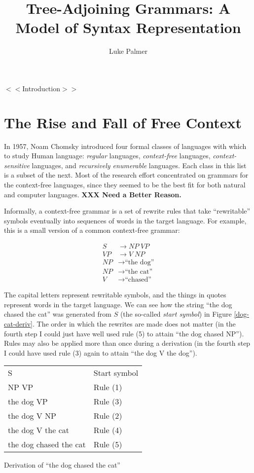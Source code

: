 \documentclass[12pt]{article}
\title{Tree-Adjoining Grammars: A Model of Syntax Representation}
\author{Luke Palmer}
\newcommand{\defn}[1]{\textit{#1}}
\newcommand{\XXX}[1]{\textbf{XXX #1}}
\begin{document}
\maketitle
\doublespace

$<<$Introduction$>>$

\section{The Rise and Fall of Free Context}

In 1957, Noam Chomsky introduced four formal classes of languages with
which to study Human language:  \defn{regular} languages,
\defn{context-free} languages, \defn{context-sensitive} languages,
and \defn{recursively enumerable} languages.  Each class in this list
is a subset of the next.  Most of the research effort concentrated on
grammars for the context-free languages, since they seemed to be the
best fit for both natural and computer languages. \XXX{Need a
Better Reason.}

Informally, a context-free grammar is a set of rewrite rules that take
``rewritable'' symbols eventually into sequences of words in the target
language.  For example, this is a small version of a common context-free
grammar:

\begin{align}
S  &\rightarrow \mathit{NP} \; \mathit{VP}      \tag{1} \\
\mathit{VP} &\rightarrow V \; \mathit{NP}       \tag{2} \\
\mathit{NP} &\rightarrow \text{``the dog''}     \tag{3} \\
\mathit{NP} &\rightarrow \text{``the cat''}     \tag{4} \\
V  &\rightarrow \text{``chased''}               \tag{5}
\end{align}

The capital letters represent rewritable symbols, and the things in
quotes represent words in the target language.  We can see how the
string ``the dog chased the cat'' was generated from $S$ (the so-called
\defn{start symbol}) in Figure \ref{dog-cat-deriv}.  The order in
which the rewrites are made does not matter (in the fourth step I could
just have well used rule (5) to attain ``the dog chased NP'').  Rules may
also be applied more than once during a derivation (in the fourth step I
could have used rule (3) again to attain ``the dog V the dog'').

\begin{Figure}
\begin{tabularx}{\linewidth}{X|X}
S                      & Start symbol \\
NP VP                  & Rule (1) \\
the dog VP             & Rule (3) \\
the dog V NP           & Rule (2) \\
the dog V the cat      & Rule (4) \\
the dog chased the cat & Rule (5) \\
\end{tabularx}
\caption{Derivation of ``the dog chased the cat''}
\label{dog-cat-deriv}
\end{Figure}
\end{document}

